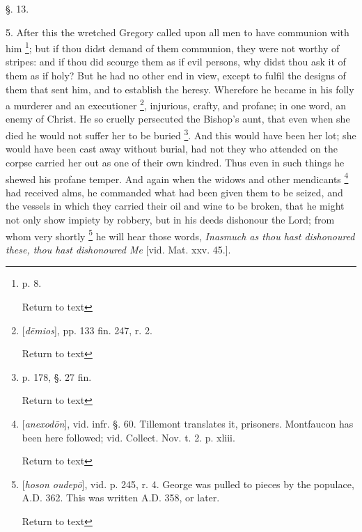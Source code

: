 §. 13.

5. After this the wretched Gregory called upon
all men to have communion with him \footnote{p. 8.

Return to text}; but if thou didst demand of them communion, they were not
worthy of stripes: and if thou did scourge them as if evil persons,
why didst thou ask it of them as if holy? But he had no other end in
view, except to fulfil the designs of them that sent him, and to
establish the heresy. Wherefore he became in his folly a murderer and
an executioner \footnote{[\emph{d\={e}mios}], pp. 133
fin. 247, r. 2.

Return to text},
injurious, crafty, and profane; in one word, an enemy of Christ. He so
cruelly persecuted the Bishop's aunt, that even when she died he would
not suffer her to be buried \footnote{p. 178, §. 27 fin.

Return to text}. And this would have been her lot; she would have been cast
away without burial, had not they who attended on the corpse carried
her out as one of their own kindred. Thus even in such things he
shewed his profane temper. And again when the widows and other
mendicants \footnote{[\emph{anexod\={o}n}],
vid. infr. §. 60. Tillemont translates it, prisoners. Montfaucon has
been here followed; vid. Collect. Nov. t. 2. p. xliii.

Return to text} had received
alms, he commanded what had been given them to be seized, and the
vessels in which they carried their oil and wine to be broken, that he
might not only show impiety by robbery, but in his deeds dishonour the
Lord; from whom very shortly \footnote{[\emph{hoson oudep\={o}}], vid.
p. 245, r. 4. George was pulled to pieces by the populace, A.D.
362. This was written A.D. 358,
or later.

Return to text}
he will hear those words, \emph{Inasmuch
as thou hast dishonoured these, thou hast dishonoured Me} [vid.
Mat. xxv. 45.].

